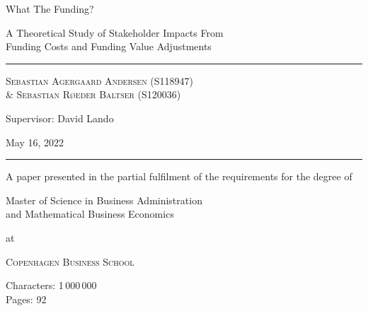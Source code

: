 \documentclass[main.tex]{subfiles}
\begin{document}
	\begin{titlepage}
		\centering
		\vspace{5cm}
		{\fontsize{48pt}{1pt}\selectfont What The Funding? \par}
		\vspace{0.5cm}
		{\Large A Theoretical Study of Stakeholder Impacts From \\ 
				Funding Costs and Funding Value Adjustments \par}
		\rule{\textwidth}{1px}\par
		{\scshape\large 
			Sebastian Agergaard Andersen {\scriptsize(S118947)} \\ %
			\& Sebastian Røeder Baltser {\scriptsize(S120036)} %
		\par}
		Supervisor: David Lando \\
		

		\scalebox{0.95}{%
			\begin{tikzpicture}[remember picture,overlay,shift={(current page.center)}]
				
			\end{tikzpicture}        
		}
		\vfill
		
		{\Large May 16, 2022 \par}		
		\rule{\textwidth}{1px}\par
		{A paper presented in the partial fulfilment
		of the requirements for the degree of \\}
		{\Large Master of Science in Business Administration \\
				and Mathematical Business Economics \par}
		at \par 
		{\scshape\LARGE Copenhagen Business School\par}
		\vspace{0.5cm}
		Characters: 1\,000\,000 \\
		Pages: 92
		
		\thispagestyle{empty}
	\end{titlepage}
\end{document}

